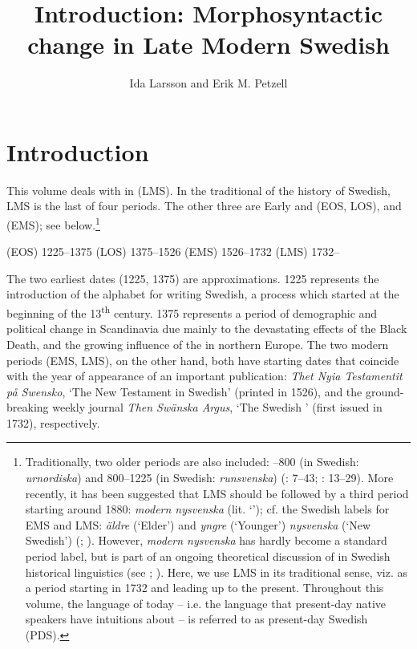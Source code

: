\documentclass[output=paper]{langscibook}
\author{Ida Larsson\affiliation{Østfold University College, Halden} and Erik M. Petzell\affiliation{Institute for Language and Folklore, Gothenburg}}
\title{Introduction: Morphosyntactic change in Late Modern Swedish}
\begin{document}
\maketitle 



\section{Introduction}\label{sec:intro:1}


This volume deals with  in  (LMS). In the traditional  of the history of Swedish, LMS is the last of four periods. The other three are Early and  (EOS, LOS), and  (EMS); see  below.\footnote{Traditionally, two older periods are also included:  –800 (in Swedish: \textit{urnordiska}) and  800–1225 (in Swedish: \textit{runsvenska}) (\citealt{Wessen1958}: 7–43; \citealt{Bergman1968}: 13–29). More recently, it has been suggested that LMS should be followed by a third period starting around 1880: \textit{modern nysvenska} (lit. ‘’); cf. the Swedish labels for EMS and LMS: \textit{äldre} (‘Elder’) and \textit{yngre} (‘Younger’) \textit{nysvenska} (‘New Swedish’) (\citealt{Thelander1988}; \citealt{Malmgren2007}). However, \textit{modern nysvenska} has hardly become a standard period label, but is part of an ongoing theoretical discussion of  in Swedish historical linguistics (see \citealt{Ralph2000}; \citealt{Johansson2007, Johansson2010}). Here, we use LMS in its traditional sense, viz. as a period starting in 1732 and leading up to the present. Throughout this volume, the language of today – i.e. the language that present-day native speakers have intuitions about – is referred to as present-day Swedish (PDS).}


\ea \label{ex:intro:1}
\ea   {} (EOS) 1225–1375
\ex  {} (LOS) 1375–1526
\ex   {} (EMS) 1526–1732
\ex   {} (LMS) 1732–
\z
\z

The two earliest dates (1225, 1375) are approximations. 1225 represents the introduction of the  alphabet for writing Swedish, a process which started at the beginning of the 13\textsuperscript{th} century. 1375 represents a period of demographic and political change in Scandinavia due mainly to the devastating effects of the Black Death, and the growing influence of the  in northern Europe. The two modern periods (EMS, LMS), on the other hand, both have starting dates that coincide with the year of appearance of an important publication: \textit{Thet Nyia Testamentit på Swensko}, ‘The New Testament in Swedish’ (printed in 1526), and the ground-breaking weekly journal \textit{Then Swänska Argus}, ‘The Swedish ’ (first issued in 1732), respectively.
\end{document}
